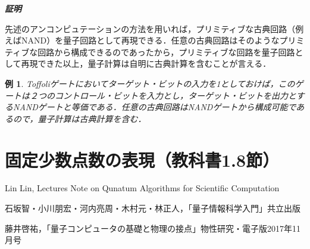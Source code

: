 \documentclass[dvipdfmx]{jarticle}
\makeatletter
\numberwithin{equation}{section}
\renewenvironment{proof}[1][\proofname]{\par
  \pushQED{\qed}
  \normalfont \topsep6\p@\@plus6\p@\relax
  \trivlist
  \item\relax
  {\itshape
  #1\@addpunct{ }}\hspace\labelsep\ignorespaces
}{
  \popQED\endtrivlist\@endpefalse
}
\theoremstyle{seminar}
\newtheorem{example}{例}[section]
\renewcommand{\proofname}{\textbf{証明}}
\makeatother
\begin{document}
\begin{proof}
  先述のアンコンピュテーションの方法を用いれば，プリミティブな古典回路（例えばNAND）を量子回路として再現できる．任意の古典回路はそのようなプリミティブな回路から構成できるのであったから，プリミティブな回路を量子回路として再現できた以上，量子計算は自明に古典計算を含むことが言える．
\end{proof}

\begin{example}
  Toffoliゲートにおいてターゲット・ビットの入力を1としておけば，このゲートは２つのコントロール・ビットを入力とし，ターゲット・ビットを出力とするNANDゲートと等価である．任意の古典回路はNANDゲートから構成可能であるので，量子計算は古典計算を含む．
\end{example}

\section{固定少数点数の表現（教科書1.8節）}

\begin{thebibliography}{9}
\item Lin Lin, Lectures Note on Qunatum Algorithms for Scientific Computation
  \item 石坂智・小川朋宏・河内亮周・木村元・林正人，「量子情報科学入門」共立出版
\item 藤井啓祐，「量子コンピュータの基礎と物理の接点」物性研究・電子版2017年11月号
\end{thebibliography}
\end{document}
